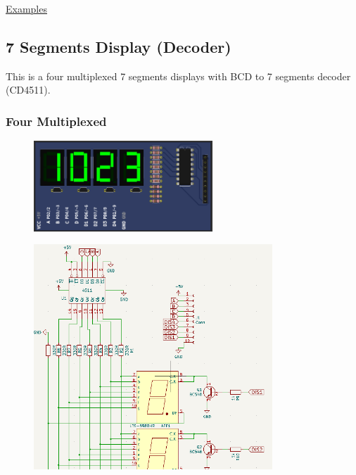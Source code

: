 \href{https://lcgamboa.github.io/picsimlab_examples/parts_7_Segments_Display.html}{Examples}

\subsection{7 Segments Display (Decoder)}

This is a four multiplexed 7 segments displays with BCD to 7 segments decoder (CD4511).


\subsubsection{Four Multiplexed}
\begin{figure}[H]
\center
\includegraphics[width=0.6\textwidth]{img/part_7seg_dec.png} 
\end{figure} 

\begin{figure}[H]
\center
\includegraphics[width=0.8\textwidth]{img/part_7seg_dec_.png} 
\end{figure} 

